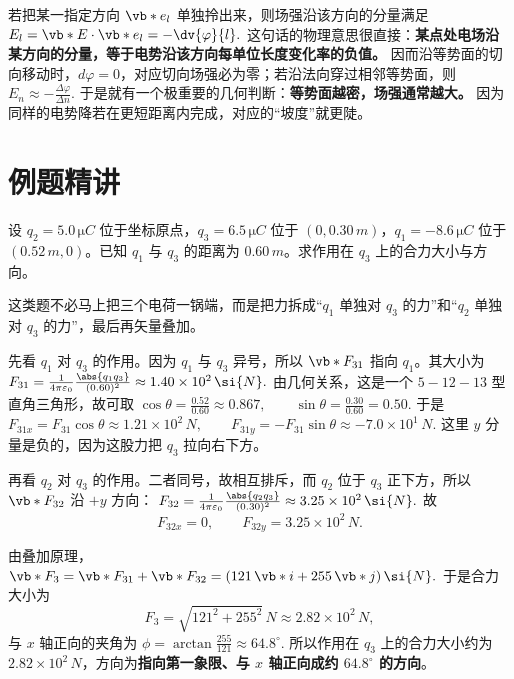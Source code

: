 \documentclass[lang=cn,11pt]{elegantbook}
\begin{document}
\begin{remark}
若把某一指定方向 \(\vb*{e}_l\) 单独拎出来，则场强沿该方向的分量满足
 \(E_l=\vb*{E}\cdot \vb*{e}_l=-\dv{\varphi}{l}.\) 
这句话的物理意思很直接：\textbf{某点处电场沿某方向的分量，等于电势沿该方向每单位长度变化率的负值。} 因而沿等势面的切向移动时，\(d\varphi=0\)，对应切向场强必为零；若沿法向穿过相邻等势面，则
 \(E_n\approx -\frac{\Delta\varphi}{\Delta n}.\) 
于是就有一个极重要的几何判断：\textbf{等势面越密，场强通常越大。} 因为同样的电势降若在更短距离内完成，对应的“坡度”就更陡。
\end{remark}

\section{例题精讲}

\begin{exercise}[三点电荷合力的矢量叠加]
设 \(q_2=5.0\,\si{\micro C}\) 位于坐标原点，\(q_3=6.5\,\si{\micro C}\) 位于 \((0,0.30\,\si{m})\)，\(q_1=-8.6\,\si{\micro C}\) 位于 \((0.52\,\si{m},0)\)。已知 \(q_1\) 与 \(q_3\) 的距离为 \(0.60\,\si{m}\)。求作用在 \(q_3\) 上的合力大小与方向。
\end{exercise}

\begin{solution}
这类题不必马上把三个电荷一锅端，而是把力拆成“\(q_1\) 单独对 \(q_3\) 的力”和“\(q_2\) 单独对 \(q_3\) 的力”，最后再矢量叠加。

先看 \(q_1\) 对 \(q_3\) 的作用。因为 \(q_1\) 与 \(q_3\) 异号，所以 \(\vb*{F}_{31}\) 指向 \(q_1\)。其大小为
 \(F_{31} =\frac{1}{4\pi\varepsilon_0}\frac{\abs{q_1q_3}}{(0.60)^2} \approx 1.40\times 10^2\,\si{N}.\) 
由几何关系，这是一个 \(5\!-\!12\!-\!13\) 型直角三角形，故可取
 \(\cos\theta=\frac{0.52}{0.60}\approx 0.867,\qquad \sin\theta=\frac{0.30}{0.60}=0.50.\) 
于是
 \(F_{31x}=F_{31}\cos\theta\approx 1.21\times 10^2\,\si{N}, \qquad F_{31y}=-F_{31}\sin\theta\approx -7.0\times 10^1\,\si{N}.\) 
这里 \(y\) 分量是负的，因为这股力把 \(q_3\) 拉向右下方。

再看 \(q_2\) 对 \(q_3\) 的作用。二者同号，故相互排斥，而 \(q_2\) 位于 \(q_3\) 正下方，所以 \(\vb*{F}_{32}\) 沿 \(+y\) 方向：
 \(F_{32} =\frac{1}{4\pi\varepsilon_0}\frac{\abs{q_2q_3}}{(0.30)^2} \approx 3.25\times 10^2\,\si{N}.\) 
故
\[
F_{32x}=0,\qquad F_{32y}=3.25\times 10^2\,\si{N}.
\]

由叠加原理，
 \(\vb*{F}_3 =\vb*{F}_{31}+\vb*{F}_{32} =(121\,\vb*{i}+255\,\vb*{j})\,\si{N}.\) 
于是合力大小为
\[
F_3=\sqrt{121^2+255^2}\,\si{N}\approx 2.82\times 10^2\,\si{N},
\]
与 \(x\) 轴正向的夹角为
 \(\phi=\arctan\frac{255}{121}\approx 64.8^\circ.\) 
所以作用在 \(q_3\) 上的合力大小约为 \(2.82\times 10^2\,\si{N}\)，方向为\textbf{指向第一象限、与 \(x\) 轴正向成约 \(64.8^\circ\) 的方向}。
\end{solution}
\end{document}
